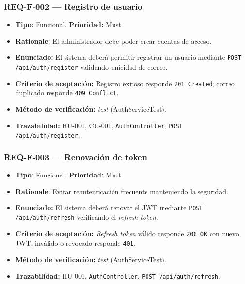 \documentclass[12pt,a4paper]{article}
\begin{document}
\subsubsection{REQ-F-002 — Registro de usuario}
\begin{itemize}
  \item \textbf{Tipo:} Funcional. \textbf{Prioridad:} Must.
  \item \textbf{Rationale:} El administrador debe poder crear cuentas de acceso.
  \item \textbf{Enunciado:} El sistema deberá permitir registrar un usuario mediante
  \texttt{POST /api/auth/register} validando unicidad de correo.
  \item \textbf{Criterio de aceptación:} Registro exitoso responde \texttt{201 Created};
  correo duplicado responde \texttt{409 Conflict}.
  \item \textbf{Método de verificación:} \textit{test} (AuthServiceTest).
  \item \textbf{Trazabilidad:} HU-001, CU-001, \texttt{AuthController},
  \texttt{POST /api/auth/register}.
\end{itemize}

\subsubsection{REQ-F-003 — Renovación de token}
\begin{itemize}
  \item \textbf{Tipo:} Funcional. \textbf{Prioridad:} Must.
  \item \textbf{Rationale:} Evitar reautenticación frecuente manteniendo la seguridad.
  \item \textbf{Enunciado:} El sistema deberá renovar el JWT mediante
  \texttt{POST /api/auth/refresh} verificando el \textit{refresh token}.
  \item \textbf{Criterio de aceptación:} \textit{Refresh token} válido responde \texttt{200 OK}
  con nuevo JWT; inválido o revocado responde \texttt{401}.
  \item \textbf{Método de verificación:} \textit{test} (AuthServiceTest).
  \item \textbf{Trazabilidad:} HU-001, \texttt{AuthController}, \texttt{POST /api/auth/refresh}.
\end{itemize}
\end{document}
